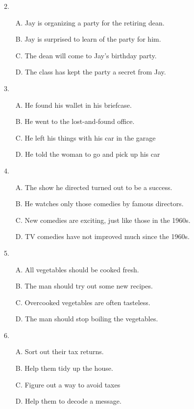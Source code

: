 \documentclass[UTF8,11pt]{ctexart}
\begin{document}
2.


\begin{itemize}[leftmargin=2em,itemsep=.2em,topsep=.4em]\item[A.] Jay is organizing a party for the retiring dean.
\item[B.] Jay is surprised to learn of the party for him.
\item[C.] The dean will come to Jay’s birthday party.
\item[D.] The class has kept the party a secret from Jay.
\end{itemize}

3.


\begin{itemize}[leftmargin=2em,itemsep=.2em,topsep=.4em]\item[A.] He found his wallet in his briefcase.
\item[B.] He went to the lost-and-found office.
\item[C.] He left his things with his car in the garage
\item[D.] He told the woman to go and pick up his car
\end{itemize}

4.


\begin{itemize}[leftmargin=2em,itemsep=.2em,topsep=.4em]\item[A.] The show he directed turned out to be a success.
\item[B.] He watches only those comedies by famous directors.
\item[C.] New comedies are exciting, just like those in the 1960s.
\item[D.] TV comedies have not improved much since the 1960s.
\end{itemize}

5.


\begin{itemize}[leftmargin=2em,itemsep=.2em,topsep=.4em]\item[A.] All vegetables should be cooked fresh.
\item[B.] The man should try out some new recipes.
\item[C.] Overcooked vegetables are often tasteless.
\item[D.] The man should stop boiling the vegetables.
\end{itemize}

6.


\begin{itemize}[leftmargin=2em,itemsep=.2em,topsep=.4em]\item[A.] Sort out their tax returns.
\item[B.] Help them tidy up the house.
\item[C.] Figure out a way to avoid taxes
\item[D.] Help them to decode a message.
\end{itemize}
\end{document}
